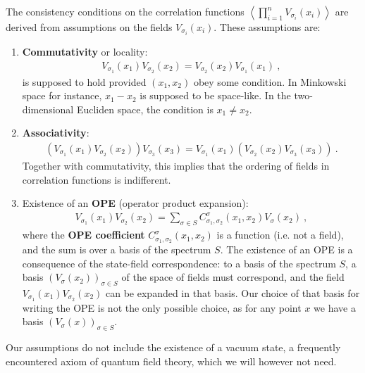 \documentclass[12pt,a4paper,notitlepage]{report}
\newcommand \la {\left\langle}
\newcommand \ra {\right\rangle}
\numberwithin{equation}{section}
\newcommand{\term}[1]{\textbf{\boldmath #1}\index{#1}}
\theoremstyle{break}
\begin{document}
The consistency conditions on the correlation functions $\la\prod_{i=1}^n V_{\sigma_i}(x_i)\ra$ are derived from assumptions on the fields $V_{\sigma_i}(x_i)$.
These assumptions are:
\begin{enumerate}
 \item \textbf{Commutativity} or locality: 
\begin{align}
 \boxed{V_{\sigma_1}(x_1)V_{\sigma_2}(x_2) = V_{\sigma_2}(x_2) V_{\sigma_1}(x_1)}\ ,
\label{comm}
\end{align}
is supposed to hold provided $(x_1,x_2)$ obey some condition.
In Minkowski space for instance, $x_1-x_2$ is supposed to be space-like.
In the two-dimensional Eucliden space, the condition is $x_1\neq x_2$.
\item \textbf{Associativity}: 
\begin{align}
 \boxed{\left(V_{\sigma_1}(x_1)V_{\sigma_2}(x_2)\right) V_{\sigma_3}(x_3) = V_{\sigma_1}(x_1)  \left(V_{\sigma_2}(x_2) V_{\sigma_3}(x_3)\right)}\ .
\label{asso}
\end{align}
Together with commutativity, this implies that the ordering of fields in correlation functions is indifferent.
\item Existence of an \term{OPE} (operator product expansion):
\begin{align}
 \boxed{V_{\sigma_1}(x_1)V_{\sigma_2}(x_2) = \sum_{\sigma\in S} C_{\sigma_1,\sigma_2}^{\sigma}(x_1,x_2) V_{\sigma}(x_2)}\ ,
\label{ope}
\end{align}
where the \term{OPE coefficient} $C_{\sigma_1,\sigma_2}^{\sigma}(x_1,x_2)$ is a function (i.e.
not a field), and the sum is over a basis of the spectrum $S$.
The existence of an OPE is a consequence of the state-field correspondence: to a basis of the spectrum $S$, a basis $(V_{\sigma}(x_2))_{\sigma\in S}$ of the space of fields must correspond, and the field 
$V_{\sigma_1}(x_1)V_{\sigma_2}(x_2)$ can be expanded in that basis.
Our choice of that basis for writing the OPE is not the only possible choice, as for any point $x$ we have a basis $(V_{\sigma}(x))_{\sigma\in S}$.  
\end{enumerate}
Our assumptions do not include the existence of a vacuum state, a frequently encountered axiom of quantum field theory, which we will however not need. 
\end{document}
